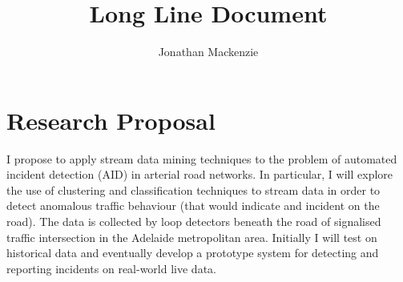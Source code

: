 \documentclass[11pt]{article}
\begin{document}
\title{Long Line Document} 
\author{Jonathan Mackenzie}
\maketitle
\section{Research Proposal}
I propose to apply stream data mining techniques to the problem of automated incident detection (AID) in arterial road networks. In particular, I will explore the use of clustering and classification techniques to stream data in order to detect anomalous traffic behaviour (that would indicate and incident on the road). The data is collected by loop detectors beneath the road of signalised traffic intersection in the Adelaide metropolitan area. Initially I will test on historical data and eventually develop a prototype system for detecting and reporting incidents on real-world live data. 
\end{document}
